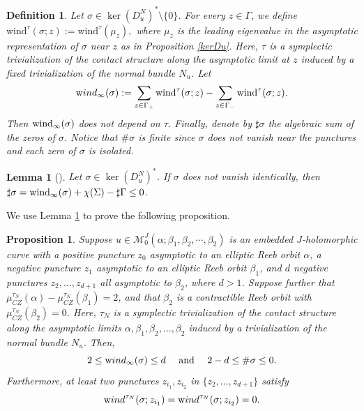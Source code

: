 \documentclass{amsart}
\newcommand{\M}{\mathcal{M}}
\newtheorem{lemma}[theorem]{Lemma}
\newtheorem{prop}[theorem]{Proposition}
\newtheorem{definition}[theorem]{Definition}
\newcommand{\wind}{\text{wind}^{\tau}}
\begin{document}
\begin{definition}
Let $\sigma \in \ker (D_u^{N})^* \setminus \{0\}$. For every $z \in \Gamma$, we define
 $\wind(\sigma;z):=\wind(\mu_z),$ where $\mu_z$ is the leading eigenvalue in the asymptotic representation of $\sigma$ near $z$ as in Proposition \ref{kerDu}. Here, $\tau$ is a symplectic trivialization of the contact structure along the asymptotic limit at $z$ induced by a fixed trivialization of the normal bundle $N_u$. Let
     $${\text wind}_{\infty}(\sigma):=\sum_{z \in \Gamma_{+}}\wind(\sigma;z)-\sum_{z \in \Gamma_{-}} \wind(\sigma;z).$$  Then ${\rm wind}_\infty(\sigma)$ does not depend on $\tau$.
     Finally, denote by $\sharp \sigma$ the algebraic sum of the zeros of $\sigma$. Notice that $\#\sigma$ is finite since $\sigma$ does not vanish near the punctures and each zero of $\sigma$ is isolated.
    
\end{definition}



\begin{lemma}[{\cite[Proposition 5.6]{prop2}}] \label{zeroswindcf}
Let $\sigma \in \ker (D_u^N)^*$. If $\sigma$ does not vanish identically, then $\sharp \sigma = {\rm wind}_{\infty}(\sigma)+\chi(\Sigma)-\sharp \Gamma\leq0$.
\end{lemma}

We use Lemma \ref{zeroswindcf} to prove the following proposition.

\begin{prop} \label{kerDu2}
Suppose $u \in \M^J_0(\alpha; \beta_1,\beta_2,\cdots,\beta_2)$ is an embedded $J$-holomorphic curve with a positive puncture $z_0$ asymptotic to an elliptic Reeb orbit $\alpha$, a negative puncture $z_1$ asymptotic to an elliptic Reeb orbit $\beta_1$, and $d$ negative punctures $z_2, \ldots, z_{d+1}$ all asymptotic to $\beta_2$, where $d > 1$. Suppose further that $\mu_{CZ}^{\tau_N}(\alpha)-\mu_{CZ}^{\tau_N}(\beta_1)=2$, and that $\beta_2$ is a contractible Reeb orbit with $\mu_{CZ}^{\tau_N}(\beta_2)=0$. Here, $\tau_N$ is a symplectic trivialization of the contact structure along the asymptotic limits $\alpha,\beta_1,\beta_2,\ldots,\beta_2$ induced by a trivialization of the normal bundle $N_u$. Then, $$ 2\leq {\text wind}_{\infty}(\sigma) \leq d \quad \mbox{ and } \quad 2-d \leq \#\sigma \leq 0. $$
Furthermore, at least two punctures $z_{i_1}, z_{i_2}$ in $\{z_2,\ldots, z_{d+1}\}$ satisfy $$
{\text wind}^{\tau_N}(\sigma;z_{i_1})={\text wind}^{\tau_N}(\sigma;z_{i_2})=0.
$$
\end{prop}
\end{document}
